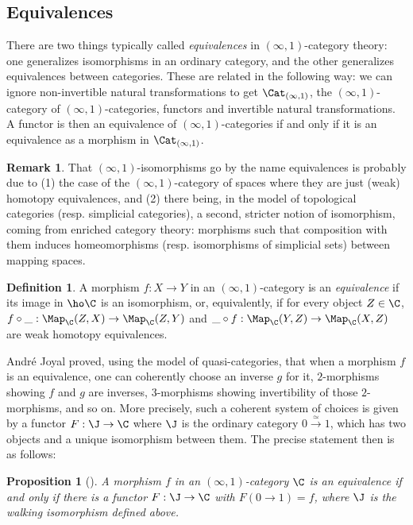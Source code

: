 \documentclass[12pt]{amsart}
\newtheorem{proposition}[theorem]{Proposition}
\theoremstyle{definition} \newtheorem{definition}[theorem]{Definition}
\newtheorem{remark}[theorem]{Remark}
\numberwithin{equation}{section}
\newcommand{\oo}{\infty}
\newcommand{\io}{$(\oo,1)$}
\newcommand{\Catio}{\Cat_{(\oo,1)}}
\begin{document}
\subsection{Equivalences}

There are two things typically called \emph{equivalences} in
\io-category theory: one generalizes isomorphisms in an ordinary
category, and the other generalizes equivalences between categories.
These are related in the following way: we can ignore
non-invertible natural transformations to get $\Catio$, the
\io-category of \io-categories, functors and invertible natural
transformations. A functor is then an equivalence of \io-categories
if and only if it is an equivalence as a morphism in $\Catio$.

\begin{remark}
  That \io-isomorphisms go by the name equivalences is probably due
  to (1) the case of the \io-category of spaces where they are just
  (weak) homotopy equivalences, and (2) there being, in the model of
  topological categories (resp. simplicial categories), a second, stricter
  notion of isomorphism, coming from enriched category theory:
  morphisms such that composition with them induces homeomorphisms
  (resp. isomorphisms of simplicial sets) between mapping spaces.
\end{remark}

\begin{definition}
  A morphism $f : X \to Y$ in an \io-category is an \emph{equivalence}
  if its image in $\ho\C$ is an isomorphism, or, equivalently, if for
  every object $Z \in \C$, $f \circ \_ : \Map_\C(Z,X) \to \Map_\C(Z,Y)$
  and $\_ \circ f : \Map_\C(Y,Z) \to \Map_\C(X,Z)$ are weak homotopy
  equivalences.
\end{definition}

Andr\'{e} Joyal proved, using the model of quasi-categories, that when
a morphism $f$ is an equivalence, one can coherently choose an inverse
$g$ for it, $2$-morphisms showing $f$ and $g$ are inverses, $3$-morphisms
showing invertibility of those $2$-morphisms, and so on. More precisely,
such a coherent system of choices is given by a functor $F : \J \to \C$
where $\J$ is the ordinary category $0 \xrightarrow{\simeq} 1$,
which has two objects and a unique isomorphism between them. The precise
statement then is as follows:

\begin{proposition}[{\cite[Corollary 1.6]{JoyalPub}}]
  A morphism $f$ in an \io-category $\C$ is an equivalence if and only
  if there is a functor $F : \J \to \C$ with $F(0 \to 1) = f$, where
  $\J$ is the \emph{walking isomorphism} defined above.
\end{proposition}
\end{document}
